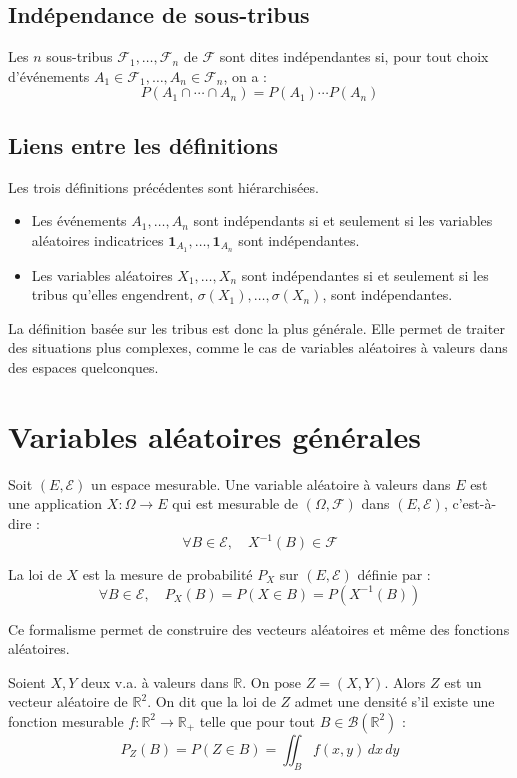 \subsection{Indépendance de sous-tribus}
\begin{definition}
Les $n$ sous-tribus $\mathcal{F}_1, \ldots, \mathcal{F}_n$ de $\mathcal{F}$ sont dites indépendantes si, pour tout choix d'événements $A_1 \in \mathcal{F}_1, \ldots, A_n \in \mathcal{F}_n$, on a :
\[ P(A_1 \cap \cdots \cap A_n) = P(A_1) \cdots P(A_n) \]
\end{definition}
\subsection{Liens entre les définitions}
Les trois définitions précédentes sont hiérarchisées.
\begin{itemize}
    \item Les événements $A_1, \ldots, A_n$ sont indépendants si et seulement si les variables aléatoires indicatrices $\mathbf{1}_{A_1}, \ldots, \mathbf{1}_{A_n}$ sont indépendantes.
    \item Les variables aléatoires $X_1, \ldots, X_n$ sont indépendantes si et seulement si les tribus qu'elles engendrent, $\sigma(X_1), \ldots, \sigma(X_n)$, sont indépendantes.
\end{itemize}
La définition basée sur les tribus est donc la plus générale. Elle permet de traiter des situations plus complexes, comme le cas de variables aléatoires à valeurs dans des espaces quelconques.
\section{Variables aléatoires générales}
\begin{definition}
Soit $(E, \mathcal{E})$ un espace mesurable. Une variable aléatoire à valeurs dans $E$ est une application $X: \Omega \to E$ qui est mesurable de $(\Omega, \mathcal{F})$ dans $(E, \mathcal{E})$, c'est-à-dire :
\[ \forall B \in \mathcal{E}, \quad X^{-1}(B) \in \mathcal{F} \]
\end{definition}
\begin{definition}
La loi de $X$ est la mesure de probabilité $P_X$ sur $(E, \mathcal{E})$ définie par :
\[ \forall B \in \mathcal{E}, \quad P_X(B) = P(X \in B) = P(X^{-1}(B)) \]
\end{definition}
Ce formalisme permet de construire des vecteurs aléatoires et même des fonctions aléatoires.
\begin{example}
Soient $X, Y$ deux v.a. à valeurs dans $\mathbb{R}$. On pose $Z = (X,Y)$. Alors $Z$ est un vecteur aléatoire de $\mathbb{R}^2$. On dit que la loi de $Z$ admet une densité s'il existe une fonction mesurable $f: \mathbb{R}^2 \to \mathbb{R}_+$ telle que pour tout $B \in \mathcal{B}(\mathbb{R}^2)$ :
\[ P_Z(B) = P(Z \in B) = \iint_B f(x,y) \,dx\,dy \]
\end{example}
